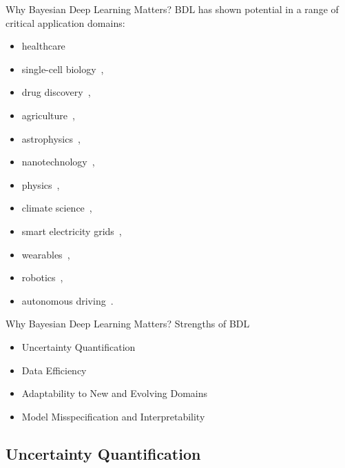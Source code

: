 \documentclass[9pt]{beamer}
\begin{document}
\begin{frame}{Why Bayesian Deep Learning Matters?}
BDL has shown potential in a range of critical application domains:
\begin{itemize}
	\item healthcare~\citep{peng2019bayesian, abdar2021uncertainty} %
	\item single-cell biology~\citep{way2018bayesian}, 
	\item drug discovery~\citep{gruver2021effective,klarner2023qsavi}, 
	\item agriculture~\citep{hernandez2020uncertainty}, 
	\item astrophysics~\citep{soboczenski2018bayesian, ferreira2020galaxy}, 
	\item nanotechnology~\citep{leitherer2021robust}, 
	\item physics~\citep{cranmer2021bayesian}, 
	\item climate science~\citep{vandal2018quantifying, luo2022bayesian}, 
	\item smart electricity grids~\citep{yang2019bayesian}, 
	\item wearables~\citep{manogaran2019wearable, zhou2020human}, 
	\item robotics~\citep{shi2021bayesian, mur2023bayesian},
	\item autonomous driving~\citep{mcallister2017concrete}. 
\end{itemize}
\end{frame}


\begin{frame}{Why Bayesian Deep Learning Matters?}
\alert{Strengths of BDL}
\begin{itemize}[<+->]
	\item Uncertainty Quantification
	\item Data Efficiency
	\item Adaptability to New and Evolving Domains
	\item Model Misspecification and Interpretability
\end{itemize}
\end{frame}


\subsection{Uncertainty Quantification}
\end{document}
